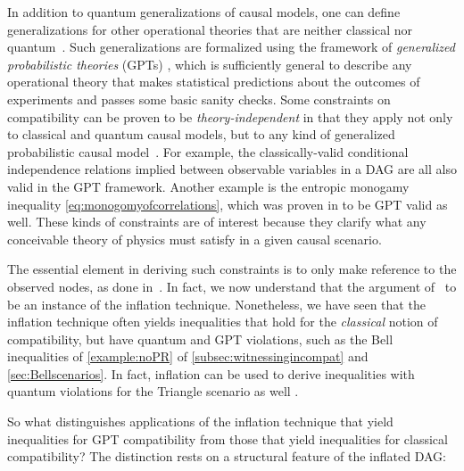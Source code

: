 {In addition to quantum generalizations of causal models, one can define generalizations for other operational theories that are neither classical nor quantum~\cite{pusey2014gdag,BeyondBellII}.
Such generalizations are formalized using the framework of {\em generalized probabilistic theories} (GPTs) \cite{Barnum2012GPT,Janotta2014GPT}, which is sufficiently general to describe any operational theory that makes statistical predictions about the outcomes of experiments and passes some basic sanity checks.  Some constraints on compatibility can be proven to be \emph{theory-independent} in that they apply not only to classical and quantum causal models, but to any kind of generalized probabilistic causal model~\cite{pusey2014gdag}. For example, the classically-valid conditional independence relations implied between observable variables in a DAG are all also valid in the GPT framework.
Another example is the entropic monogamy inequality \cref{eq:monogomyofcorrelations}, which was proven in \cite{pusey2014gdag} to be GPT valid as well. These kinds of constraints are of interest because they clarify what any conceivable theory of physics must satisfy in a given causal scenario. 

The essential element in deriving such constraints is to only make reference to the observed nodes, as done in~\cite{pusey2014gdag}. In fact, we now understand that the argument of~\cite{pusey2014gdag} to be an instance of the inflation technique. Nonetheless, we have seen that the inflation technique often yields inequalities that hold for the {\em classical} notion of compatibility, but have quantum and GPT violations, such as the Bell inequalities of \cref{example:noPR} of \cref{subsec:witnessingincompat} and \cref{sec:Bellscenarios}. In fact, inflation can be used to derive inequalities with quantum violations for the Triangle scenario as well \cite{TC2016trianglequantum}.

So what distinguishes applications of the inflation technique that yield inequalities for GPT compatibility from those that yield inequalities for classical compatibility?   The distinction rests on a structural feature of the inflated DAG:

}
